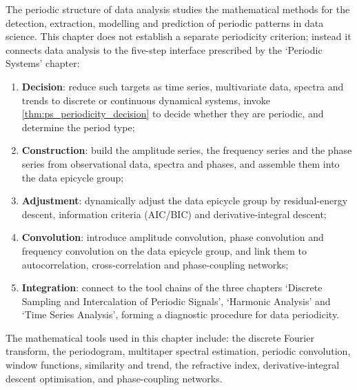 \begin{remark}\label{rem:data_five_steps_positioning}
The periodic structure of data analysis studies the mathematical methods for the detection, extraction, modelling and prediction of periodic patterns in data science. This chapter does not establish a separate periodicity criterion; instead it connects data analysis to the five-step interface prescribed by the `Periodic Systems' chapter:
\begin{enumerate}[label=(\arabic*)]
    \item \textbf{Decision}: reduce such targets as time series, multivariate data, spectra and trends to discrete or continuous dynamical systems, invoke \cref{thm:ps_periodicity_decision} to decide whether they are periodic, and determine the period type;
    \item \textbf{Construction}: build the amplitude series, the frequency series and the phase series from observational data, spectra and phases, and assemble them into the data epicycle group;
    \item \textbf{Adjustment}: dynamically adjust the data epicycle group by residual-energy descent, information criteria (AIC/BIC) and derivative-integral descent;
    \item \textbf{Convolution}: introduce amplitude convolution, phase convolution and frequency convolution on the data epicycle group, and link them to autocorrelation, cross-correlation and phase-coupling networks;
    \item \textbf{Integration}: connect to the tool chains of the three chapters `Discrete Sampling and Intercalation of Periodic Signals', `Harmonic Analysis' and `Time Series Analysis', forming a diagnostic procedure for data periodicity.
\end{enumerate}
The mathematical tools used in this chapter include: the discrete Fourier transform, the periodogram, multitaper spectral estimation, periodic convolution, window functions, similarity and trend, the refractive index, derivative-integral descent optimisation, and phase-coupling networks.
\end{remark}

